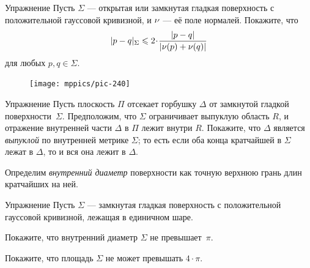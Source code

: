 \begin{thm}{Упражнение}\label{ex:length-dist-conv}
Пусть $\Sigma$ --- открытая или замкнутая гладкая поверхность с положительной гауссовой кривизной, и $\nu$ --- её поле нормалей.
Покажите, что 
\[\dist{p}{q}\Sigma\le 2\cdot \frac{|p-q|}{|\Norm(p)+\Norm(q)|}\]
для любых $p,q\in \Sigma$.
\end{thm}


\begin{figure}
\vskip-14mm
\centering
\texttt{[image: mppics/pic-240]}
\end{figure}

\begin{thm}{Упражнение}\label{ex:hat-convex}
Пусть плоскость $\Pi$ отсекает горбушку $\Delta$ от замкнутой гладкой поверхности~$\Sigma$.
Предположим, что $\Sigma$ ограничивает выпуклую область $R$, и отражение внутренней части $\Delta$ в $\Pi$ лежит внутри $R$.
Покажите, что $\Delta$ является \emph{выпуклой} по внутренней метрике $\Sigma$;
то есть 
если оба конца кратчайшей в $\Sigma$ 
лежат в $\Delta$,
то и вся она лежит в $\Delta$.
\end{thm}

Определим \emph{внутренний диаметр} поверхности как точную верхнюю грань длин кратчайших на ней.

\begin{thm}{Упражнение}\label{ex:intrinsic-diameter}
Пусть $\Sigma$ --- замкнутая гладкая поверхность с положительной гауссовой кривизной, лежащая в единичном шаре.

\begin{subthm}{}
Покажите, что внутренний диаметр $\Sigma$ не превышает~$\pi$.
\end{subthm}

\begin{subthm}{}
Покажите, что площадь $\Sigma$ не может превышать $4\cdot \pi$.
\end{subthm}

\end{thm}
